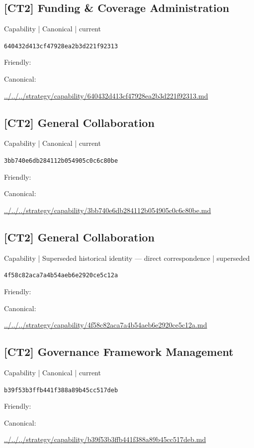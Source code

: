 \documentclass[10pt,a4paper]{article}
\begin{document}
\subsection*{[CT2] Funding \& Coverage Administration}
{\small Capability | Canonical | current}\par
\texttt{640432d413cf47928ea2b3d221f92313}\par
Friendly: \par
Canonical: \par
{\footnotesize\url{../../../strategy/capability/640432d413cf47928ea2b3d221f92313.md}}\par
\subsection*{[CT2] General Collaboration}
{\small Capability | Canonical | current}\par
\texttt{3bb740e6db284112b054905c0c6c80be}\par
Friendly: \par
Canonical: \par
{\footnotesize\url{../../../strategy/capability/3bb740e6db284112b054905c0c6c80be.md}}\par
\subsection*{[CT2] General Collaboration}
{\small Capability | Superseded historical identity — direct correspondence | superseded}\par
\texttt{4f58c82aca7a4b54aeb6e2920ce5c12a}\par
Friendly: \par
Canonical: \par
{\footnotesize\url{../../../strategy/capability/4f58c82aca7a4b54aeb6e2920ce5c12a.md}}\par
\subsection*{[CT2] Governance Framework Management}
{\small Capability | Canonical | current}\par
\texttt{b39f53b3ffb441f388a89b45cc517deb}\par
Friendly: \par
Canonical: \par
{\footnotesize\url{../../../strategy/capability/b39f53b3ffb441f388a89b45cc517deb.md}}\par
\end{document}
